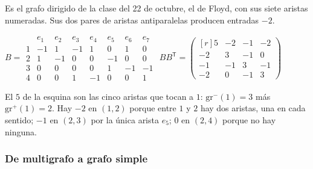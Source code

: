 \documentclass[11pt,letterpaper]{article}
\begin{document}
\begin{ejemplo}
  Es el grafo dirigido de la clase del 22 de octubre, el de Floyd, con
  sus siete aristas numeradas. Sus dos pares de aristas antiparalelas
  producen entradas $-2$.
  \begin{center}
  \hspace{0.4cm}
  $B = \begin{array}{c|rrrrrrr}
      & e_1 & e_2 & e_3 & e_4 & e_5 & e_6 & e_7 \\ \hline
    1 & -1 &  1 & -1 &  1 &  0 &  1 &  0 \\
    2 &  1 & -1 &  0 &  0 & -1 &  0 &  0 \\
    3 &  0 &  0 &  0 &  0 &  1 & -1 & -1 \\
    4 &  0 &  0 &  1 & -1 &  0 &  0 &  1
  \end{array}$
  \hspace{0.3cm}
  $BB^{\mathsf{T}} =
  \begin{pmatrix*}[r]
     5 & -2 & -1 & -2 \\
    -2 &  3 & -1 &  0 \\
    -1 & -1 &  3 & -1 \\
    -2 &  0 & -1 &  3
  \end{pmatrix*}$
  \end{center}
  El $5$ de la esquina son las cinco aristas que tocan a $1$:
  $\text{gr}^{-}(1) = 3$ más $\text{gr}^{+}(1) = 2$. Hay $-2$ en
  $(1,2)$ porque entre $1$ y $2$ hay dos aristas, una en cada
  sentido; $-1$ en $(2,3)$ por la única arista $e_5$; $0$ en $(2,4)$
  porque no hay ninguna.
\end{ejemplo}

\subsubsection*{De multigrafo a grafo simple}
\end{document}
